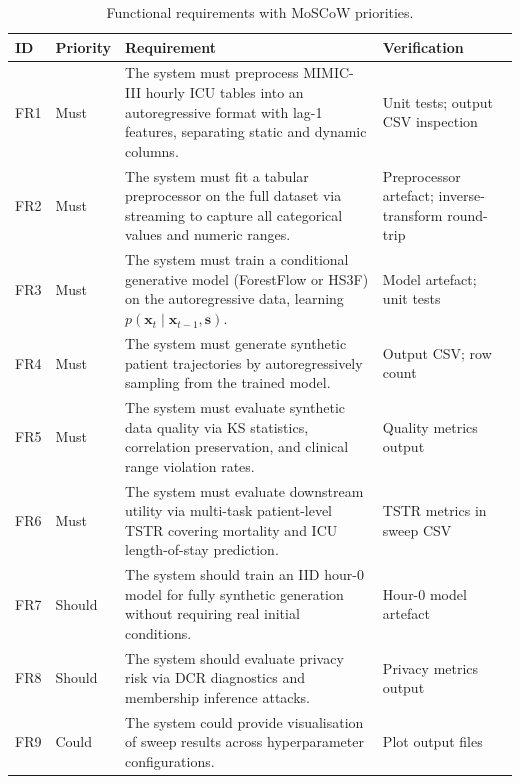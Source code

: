 \begin{table}[H]
\centering
\small
\begin{singlespace}
\setlength{\tabcolsep}{3pt}
\begin{tabularx}{\textwidth}{@{}ll>{\raggedright\arraybackslash}Xl@{}}
\toprule
\textbf{ID} & \textbf{Priority} & \textbf{Requirement} & \textbf{Verification} \\
\midrule
FR1 & Must & The system must preprocess MIMIC-III hourly ICU tables into an autoregressive format with lag-1 features, separating static and dynamic columns. & Unit tests; output CSV inspection \\
\midrule
FR2 & Must & The system must fit a tabular preprocessor on the full dataset via streaming to capture all categorical values and numeric ranges. & Preprocessor artefact; inverse-transform round-trip \\
\midrule
FR3 & Must & The system must train a conditional generative model (ForestFlow or HS3F) on the autoregressive data, learning $p(\mathbf{x}_t \mid \mathbf{x}_{t-1}, \mathbf{s})$. & Model artefact; unit tests \\
\midrule
FR4 & Must & The system must generate synthetic patient trajectories by autoregressively sampling from the trained model. & Output CSV; row count \\
\midrule
FR5 & Must & The system must evaluate synthetic data quality via KS statistics, correlation preservation, and clinical range violation rates. & Quality metrics output \\
\midrule
FR6 & Must & The system must evaluate downstream utility via multi-task patient-level TSTR covering mortality and ICU length-of-stay prediction. & TSTR metrics in sweep CSV \\
\midrule
FR7 & Should & The system should train an IID hour-0 model for fully synthetic generation without requiring real initial conditions. & Hour-0 model artefact \\
\midrule
FR8 & Should & The system should evaluate privacy risk via DCR diagnostics and membership inference attacks. & Privacy metrics output \\
\midrule
FR9 & Could & The system could provide visualisation of sweep results across hyperparameter configurations. & Plot output files \\
\bottomrule
\end{tabularx}
\end{singlespace}
\caption{Functional requirements with MoSCoW priorities.}
\label{tab:func-req}
\end{table}

